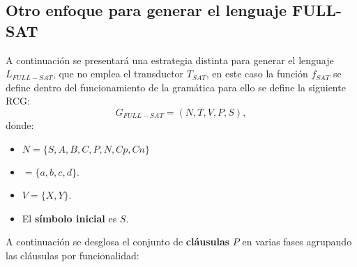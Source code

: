 \documentclass{article}
\begin{document}
\subsection{Otro enfoque para generar el lenguaje FULL-SAT}

A continuación se presentará una estrategia distinta para generar el lenguaje $L_{FULL-SAT}$, que no emplea el transductor $T_{SAT}$,
en este caso la función $f_{SAT}$ se define dentro del funcionamiento de la gramática para ello se define la siguiente RCG:
\[
    G_{FULL-SAT} = (N, T, V, P, S),
\]
donde:

\begin{itemize}
    \item $N=\{S,A,B,C,P,N,Cp,Cn\}$
    \item $=\{a,b,c,d\}$.
    \item $V=\{X,Y\}$.
    \item El \textbf{símbolo inicial} es $S$.
\end{itemize}

A continuación se desglosa el conjunto de \textbf{cláusulas} $P$ en varias fases agrupando las cláusulas
por funcionalidad:
\end{document}
